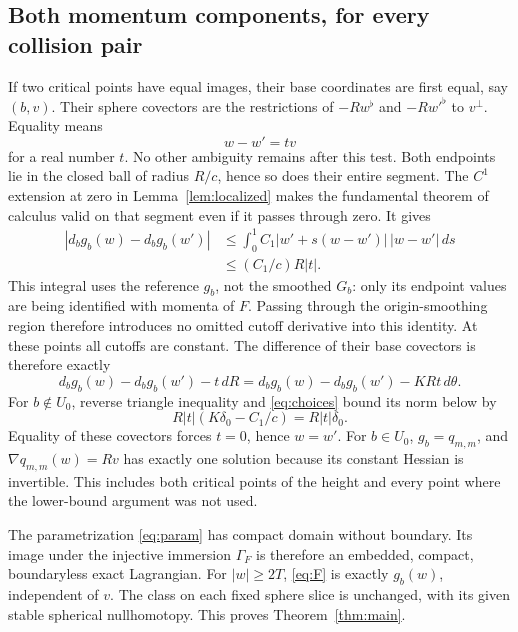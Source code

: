 \documentclass[11pt]{article}
\theoremstyle{remark}
\begin{document}
\subsection{Both momentum components, for every collision pair}
If two critical points have equal images, their base coordinates
are first equal, say \((b,v)\). Their sphere covectors are the
restrictions of \(-Rw^\flat\) and \(-Rw'^\flat\) to \(v^\perp\).
Equality means
\begin{equation}\label{eq:parallel}
                       w-w'=tv
\end{equation}
for a real number \(t\). No other ambiguity remains after this test.
Both endpoints lie in the closed ball of radius \(R/c\), hence so
does their entire segment. The \(C^1\) extension at zero in
Lemma~\ref{lem:localized} makes the fundamental theorem of calculus
valid on that segment even if it passes through zero. It gives
\begin{equation}\label{eq:mixed}
 \begin{split}
 |d_bg_b(w)-d_bg_b(w')|
 &\leq\int_0^1 C_1|w'+s(w-w')|\,|w-w'|\,ds\\
 &\leq (C_1/c)R|t|.
 \end{split}
\end{equation}
This integral uses the reference \(g_b\), not the smoothed \(G_b\):
only its endpoint values are being identified with momenta of \(F\).
Passing through the origin-smoothing region therefore introduces
no omitted cutoff derivative into this identity.
At these points all cutoffs are constant. The difference of their
base covectors is therefore exactly
\[
 d_bg_b(w)-d_bg_b(w')-t\,dR
      =d_bg_b(w)-d_bg_b(w')-KRt\,d\theta.
\]
For \(b\notin U_0\), reverse triangle inequality and
\eqref{eq:choices} bound its norm below by
\[
             R|t|(K\delta_0-C_1/c)=R|t|\delta_0.
\]
Equality of these covectors forces \(t=0\), hence \(w=w'\).
For \(b\in U_0\), \(g_b=q_{m,m}\), and
\(\nabla q_{m,m}(w)=Rv\) has exactly one solution because its
constant Hessian is invertible. This includes both critical points
of the height and every point where the lower-bound argument was
not used.

The parametrization \eqref{eq:param} has compact domain without
boundary. Its image under the injective immersion \(\Gamma_F\)
is therefore an embedded, compact, boundaryless exact Lagrangian.
For \(|w|\geq2T\), \eqref{eq:F} is exactly \(g_b(w)\), independent
of \(v\). The class on each fixed sphere slice is unchanged, with
its given stable spherical nullhomotopy. This proves
Theorem~\ref{thm:main}.
\end{document}
